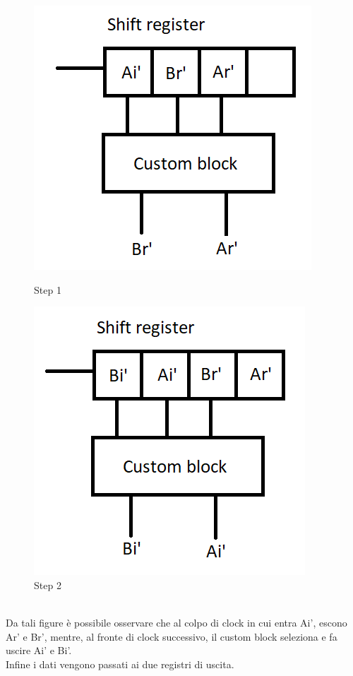 \documentclass[a4paper, titlepage]{article}
\begin{document}
\begin{figure}[h]
\begin{minipage}[c]{0.5\linewidth}
\includegraphics[scale=0.5]{slpitter1.png}
\caption{Step 1}
\label{fig:sp1}
\end{minipage}
\hspace{5mm}
 \begin{minipage}[c]{0.5\linewidth}
\includegraphics[scale=0.5]{slpitter2.png}
\caption{Step 2}
\label{fig:sp2}
\end{minipage} 
\end{figure}
\\
Da tali figure è possibile osservare che al colpo di clock in cui entra Ai', escono Ar' e Br', mentre, al fronte di clock successivo, il custom block seleziona e fa uscire Ai' e Bi'. \\Infine i dati vengono passati ai due registri di uscita.
\end{document}
